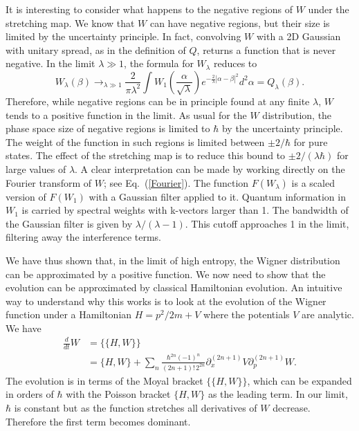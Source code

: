 \documentclass{SciPost}
\begin{document}
It is interesting to consider what happens to the negative regions of $W$ under the stretching map. We know that $W$ can have negative regions, but their size is limited by the uncertainty principle. In fact, convolving $W$ with a 2D Gaussian with unitary spread, as in the definition of $Q$, returns a function that is never negative. In the limit $\lambda\gg1$, the formula for $W_\lambda$ reduces to
\begin{equation}
	W_\lambda(\beta)\rightarrow_{\lambda\gg1}\frac{2}{\pi\lambda^2}\int W_1\left(\frac{\alpha}{\sqrt{\lambda}}\right)e^{-\frac{2}{\lambda}\left|\alpha-\beta\right|^2}d^2\alpha=Q_\lambda(\beta).
\end{equation}
Therefore, while negative regions can be in principle found at any finite $\lambda$, $W$ tends to a positive function in the limit. As usual for the $W$ distribution, the phase space size of negative regions is limited to $\hbar$ by the uncertainty principle. The weight of the function in such regions is limited between $\pm 2/\hbar$ for pure states. The effect of the stretching map is to reduce this bound to $\pm 2/(\lambda\hbar)$ for large values of $\lambda$. A clear interpretation can be made by working directly on the Fourier transform of $W$; see Eq.~(\ref{Fourier}). The function $F(W_\lambda)$ is a scaled version of $F(W_1)$ with a Gaussian filter applied to it. Quantum information in $W_1$ is carried by spectral weights with k-vectors larger than 1. The bandwidth of the Gaussian filter is given by $\lambda/(\lambda-1)$. This cutoff approaches 1 in the limit, filtering away the interference terms.

We have thus shown that, in the limit of high entropy, the Wigner distribution can be approximated by a positive function. We now need to show that the evolution can be approximated by classical Hamiltonian evolution. An intuitive way to understand why this works is to look at the evolution of the Wigner function under a Hamiltonian $H = p^2/2m + V$ where the potentials $V$ are analytic. We have~\cite{hillery1984distribution}
\begin{equation}
	\begin{aligned}
		\frac{d}{dt} W &= \{\{H, W\}\} \\
		&= \{H, W\} + \sum_n \frac{\hbar^{2n} (-1)^n}{(2n+1)! \, 2^{2n}} \partial_x^{(2n+1)} V \partial_p^{(2n+1)} W.
	\end{aligned}
\end{equation}
The evolution is in terms of the Moyal bracket $\{\{H,W\}\}$, which can be expanded in orders of $\hbar$ with the Poisson bracket $\{H,W\}$ as the leading term. In our limit, $\hbar$ is constant but as the function stretches all derivatives of $W$ decrease. Therefore the first term becomes dominant.
\end{document}
